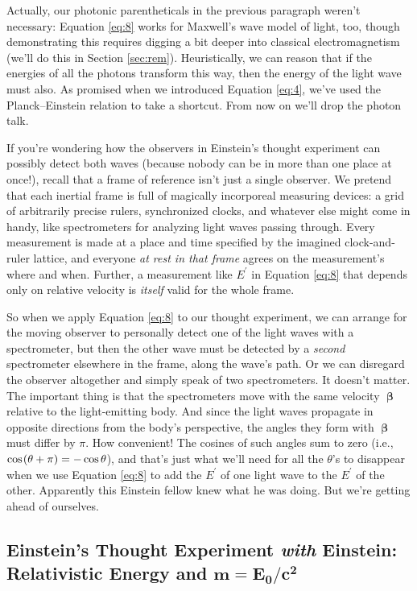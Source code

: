 \documentclass[12pt]{article}
\newcommand{\vvbeta}{\bm{\upbeta}}
\begin{document}
Actually, our photonic parentheticals in the previous paragraph weren't necessary: Equation \ref{eq:8} works for Maxwell's wave model of light, too, though demonstrating this requires digging a bit deeper into classical electromagnetism (we'll do this in Section \ref{sec:rem}). Heuristically, we can reason that if the energies of all the photons transform this way, then the energy of the light wave must also. As promised when we introduced Equation \ref{eq:4}, we've used the Planck--Einstein relation to take a shortcut. From now on we'll drop the photon talk.

If you're wondering how the observers in Einstein's thought experiment can possibly detect both waves (because nobody can be in more than one place at once!), recall that a frame of reference isn't just a single observer. We pretend that each inertial frame is full of magically incorporeal measuring devices: a grid of arbitrarily precise rulers, synchronized clocks, and whatever else might come in handy, like spectrometers for analyzing light waves passing through. Every measurement is made at a place and time specified by the imagined clock-and-ruler lattice, and everyone \emph{at rest in that frame} agrees on the measurement's where and when. Further, a measurement like $E^\prime$ in Equation \ref{eq:8} that depends only on relative velocity is \emph{itself} valid for the whole frame.

So when we apply Equation \ref{eq:8} to our thought experiment, we can arrange for the moving observer to personally detect one of the light waves with a spectrometer, but then the other wave must be detected by a \emph{second} spectrometer elsewhere in the frame, along the wave's path. Or we can disregard the observer altogether and simply speak of two spectrometers. It doesn't matter. The important thing is that the spectrometers move with the same velocity $\vvbeta$ relative to the light-emitting body. And since the light waves propagate in opposite directions from the body's perspective, the angles they form with $\vvbeta$ must differ by $\pi$. How convenient! The cosines of such angles sum to zero (i.e., $\cos \mkern1.5mu (\theta+\pi)=-\cos\theta$), and that's just what we'll need for all the $\theta$'s to disappear when we use Equation \ref{eq:8} to add the $E^{\prime}$ of one light wave to the $E^{\prime}$ of the other. Apparently this Einstein fellow knew what he was doing. But we're getting ahead of ourselves.


\subsection[Einstein's Thought Experiment \emph{with} Einstein: Relativistic Energy and $m=E_0/c^2$]{Einstein's Thought Experiment \emph{with} Einstein:\\Relativistic Energy and $\bm{m=E_0/c^2}$}\label{ssec:re}
\end{document}
